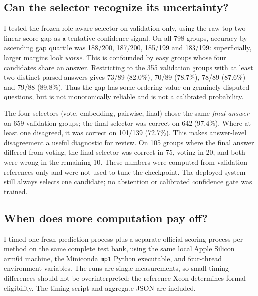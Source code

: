 \documentclass[10pt,a4paper]{article}
\newcommand{\pct}{\%}
\newcommand{\code}[1]{\texttt{#1}}
\begin{document}
\subsection{Can the selector recognize its uncertainty?}
I tested the frozen role-aware selector on validation only, using the raw top-two linear-score gap as a tentative confidence signal. On all 798 groups, accuracy by ascending gap quartile was 188/200, 187/200, 185/199 and 183/199: superficially, larger margins look \emph{worse}. This is confounded by easy groups whose four candidates share an answer. Restricting to the 355 validation groups with at least two distinct parsed answers gives 73/89 (82.0\pct), 70/89 (78.7\pct), 78/89 (87.6\pct) and 79/88 (89.8\pct). Thus the gap has some ordering value on genuinely disputed questions, but is not monotonically reliable and is not a calibrated probability.

The four selectors (vote, embedding, pairwise, final) chose the same \emph{final answer} on 659 validation groups; the final selector was correct on 642 (97.4\pct). Where at least one disagreed, it was correct on 101/139 (72.7\pct). This makes answer-level disagreement a useful diagnostic for review. On 105 groups where the final answer differed from voting, the final selector was correct in 75, voting in 20, and both were wrong in the remaining 10. These numbers were computed from validation references only and were not used to tune the checkpoint. The deployed system still always selects one candidate; no abstention or calibrated confidence gate was trained.

\subsection{When does more computation pay off?}
I timed one fresh prediction process plus a separate official scoring process per method on the same complete test bank, using the same local Apple Silicon arm64 machine, the Miniconda \code{mp1} Python executable, and four-thread environment variables. The runs are single measurements, so small timing differences should not be overinterpreted; the reference Xeon determines formal eligibility. The timing script and aggregate JSON are included.
\end{document}
